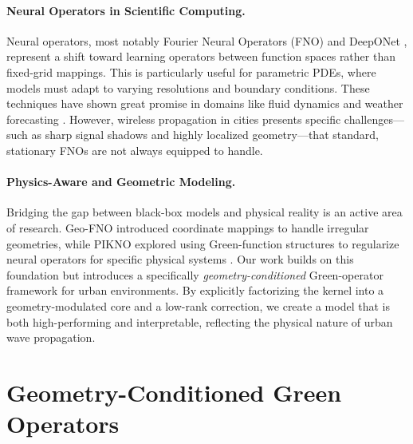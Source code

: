 \documentclass{article}
\begin{document}
\paragraph{Neural Operators in Scientific Computing.}
Neural operators, most notably Fourier Neural Operators (FNO) \cite{li2020fourier} and DeepONet \cite{lu2021deeponet}, represent a shift toward learning operators between function spaces rather than fixed-grid mappings. This is particularly useful for parametric PDEs, where models must adapt to varying resolutions and boundary conditions. These techniques have shown great promise in domains like fluid dynamics and weather forecasting \cite{kochkov2024climateneo,llanes2024scatteringno}. However, wireless propagation in cities presents specific challenges—such as sharp signal shadows and highly localized geometry—that standard, stationary FNOs are not always equipped to handle. 

\paragraph{Physics-Aware and Geometric Modeling.}
Bridging the gap between black-box models and physical reality is an active area of research. Geo-FNO \cite{gao2021geofno} introduced coordinate mappings to handle irregular geometries, while PIKNO \cite{li2022pikno} explored using Green-function structures to regularize neural operators for specific physical systems \cite{li2021physics}. Our work builds on this foundation but introduces a specifically \emph{geometry-conditioned} Green-operator framework for urban environments. By explicitly factorizing the kernel into a geometry-modulated core and a low-rank correction, we create a model that is both high-performing and interpretable, reflecting the physical nature of urban wave propagation.


\section{Geometry-Conditioned Green Operators}
\label{sec:method}

\end{document}
